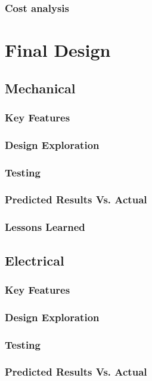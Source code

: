 \documentclass[ece]{uw-wkrpt}
\let\oldsection\section
\renewcommand\section{\clearpage\oldsection}
\begin{document}
\subsubsection{Cost analysis}


\section{Final Design}

\subsection{Mechanical}

\subsubsection{Key Features}
\subsubsection{Design Exploration}
\subsubsection{Testing}
\subsubsection{Predicted Results Vs. Actual}
\subsubsection{Lessons Learned}

\subsection{Electrical}

\subsubsection{Key Features}
\subsubsection{Design Exploration}
\subsubsection{Testing}
\subsubsection{Predicted Results Vs. Actual}
\end{document}
